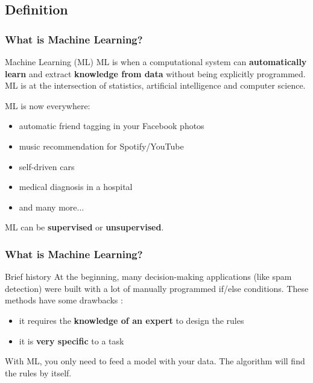 \documentclass{beamer}
\begin{document}
\subsection{Definition}
\begin{frame}
  \frametitle{What is Machine Learning?}
  \begin{block}{Machine Learning (ML)}
    ML is when a computational system can \textbf{automatically learn} and
    extract \textbf{knowledge from data} without being explicitly programmed.
    ML is at the intersection of statistics, artificial intelligence and
    computer science.

    ML is now everywhere:
    \begin{itemize}
      \item automatic friend tagging in your Facebook photos
      \item music recommendation for Spotify/YouTube
      \item self-driven cars
      \item medical diagnosis in a hospital
      \item and many more...
    \end{itemize}
    ML can be \textbf{supervised} or \textbf{unsupervised}.
  \end{block}
\end{frame}

\begin{frame}
  \frametitle{What is Machine Learning?}
  \begin{alertblock}{Brief history}
    At the beginning, many decision-making applications (like spam detection)
    were built with a lot of manually programmed if/else conditions. These
    methods have some drawbacks :
    \begin{itemize}
      \item it requires the \textbf{knowledge of an expert} to design the rules
      \item it is \textbf{very specific} to a task
    \end{itemize}

    With ML, you only need to feed a model with your data. The algorithm will
    find the rules by itself.
  \end{alertblock}
\end{frame}

\end{document}
